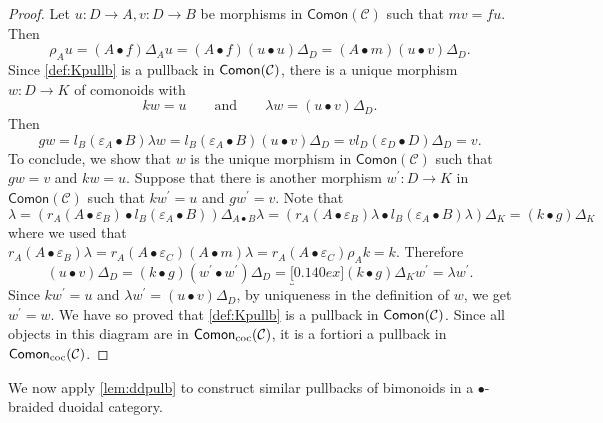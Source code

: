 \documentclass[nosumlimits,twoside]{amsart}
\theoremstyle{definition}
\theoremstyle{remark}
\newcommand{\Cc}{\mathcal{C}}
\def\Comon{{\sf Comon}}
\def\cComon{{\sf Comon}_{\mathrm{coc}}}
\begin{document}
\begin{proof}
Let $u:D\rightarrow A,v:D\rightarrow B$ be morphisms in $\mathsf{Comon}(\Cc)$ such that $%
mv=fu.$ Then%
\begin{equation*}
\rho _{A}u=\left( A\bullet f\right) \Delta _{A}u=\left( A\bullet f\right) \left( u\bullet u\right) \Delta _{D}=\left( A\bullet m\right) \left( u\bullet v\right) \Delta _{D}.
\end{equation*}%
Since \eqref{def:Kpullb} is a pullback in $\Comon(\Cc)$, there is a unique morphism $w:D\rightarrow K$ of comonoids with
\begin{equation*}
kw=u\qquad \text{and}\qquad \lambda w=\left( u\bullet v\right) \Delta
_{D}.
\end{equation*}%
Then
\[
gw=l_{B}\left( \varepsilon _{A}\bullet
B\right) \lambda w=l_{B}\left( \varepsilon _{A}\bullet
B\right) \left( u\bullet v\right) \Delta _{D}=vl_{D}\left( \varepsilon _{D}\bullet D\right) \Delta _{D}=v.
\]
To conclude, we show that $w$ is the unique morphism in $\mathsf{Comon}(\Cc)$ such that $gw =v$ and $kw =u$. Suppose that there is another morphism $w^{\prime }:D\rightarrow K$ in $\mathsf{Comon}(\Cc)$ such
that $kw^{\prime }=u$ and $gw^{\prime }=v$. Note that
\[\lambda=(r_A(A\bullet \varepsilon_B)\bullet l_B(\varepsilon_A\bullet B))\Delta_{A\bullet B}\lambda
=(r_A(A\bullet \varepsilon_B)\lambda\bullet l_B(\varepsilon_A\bullet B)\lambda)\Delta_K=(k\bullet g)\Delta_K\]
where we used that $r_A(A\bullet \varepsilon_B)\lambda=r_A(A\bullet \varepsilon_C)(A\bullet m)\lambda=r_A(A\bullet \varepsilon_C)\rho_A k=k.$
Therefore
\begin{equation*}
\left( u\bullet v\right) \Delta _{D}=\left( k\bullet g\right) \left( w^{\prime }\bullet w^{\prime }\right) \Delta _{D}=\underbracket[0.140ex]{\left( k\bullet g\right) \Delta _{K}}w^{\prime }=\lambda w^{\prime }.
\end{equation*}%
Since $kw^{\prime }=u$ and $\lambda w^{\prime }=\left( u\bullet v\right)
\Delta _{D}$, by uniqueness in the definition of $w$, we get $%
w^{\prime }=w.$ We have so proved that \eqref{def:Kpullb} is a pullback in $\Comon(\Cc)$. Since all objects in this diagram are in $\cComon(\Cc)$, it is a fortiori a pullback in $\cComon(\Cc)$.
\end{proof}

We now apply \cref{lem:ddpulb} to construct similar pullbacks of bimonoids in a $\bullet$-braided duoidal category.
\end{document}
